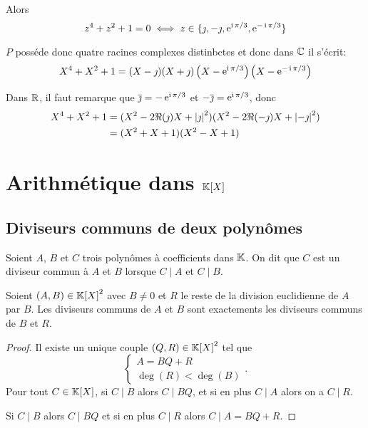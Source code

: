 Alors
\begin{equation}
  z^4+z^2+1 = 0 \iff z \in \{\jmath, -\jmath, \operatorname{e}^{\operatorname{i}\pi/3}, \operatorname{e}^{-\operatorname{i}\pi/3}\}
\end{equation}

\(P\) posséde donc quatre racines complexes distinbctes et donc dans \(\mathbb{C}\) il 
s'écrit:
\begin{equation}
  X^4+X^2+1 = 
  (X-\jmath)(X+\jmath)\left(X-\operatorname{e}^{\operatorname{i}\pi/3}\right)\left(X-\operatorname{e}^{-\operatorname{i}\pi/3}\right)
\end{equation}

Dans \(\mathbb{R}\), il faut remarque que \(\overline{\jmath} = -\operatorname{e}^{\operatorname{i}\pi/3}\) et 
\(-\overline{\jmath} = \operatorname{e}^{\operatorname{i}\pi/3}\), donc
\begin{align}
  X^4+X^2+1 &= 
  (X^2-2\Re(\jmath)X+\left\lvert\jmath\right\rvert^2)(X^2-2\Re(-\jmath)X+\left\lvert-\jmath\right\rvert^2)\\
  & = (X^2+X+1)(X^2-X+1)
\end{align}

\section{Arithmétique dans \(\mathbb{K}[X]\)}

\subsection{Diviseurs communs de deux polynômes}

\begin{defdef}
  Soient \(A\), \(B\) et \(C\) trois polynômes à coefficients dans \(\mathbb{K}\). On 
  dit que \(C\) est un diviseur commun à \(A\) et \(B\) lorsque \(C\mid{}A\) et 
  \(C\mid{}B\).
\end{defdef}

\begin{prop}
  Soient \((A, B) \in {\mathbb{K}[X]}^2\) avec \(B \neq 0\) et \(R\) le reste de la division 
  euclidienne de \(A\) par \(B\). Les diviseurs communs de \(A\) et \(B\) sont 
  exactements les diviseurs communs de \(B\) et \(R\).
\end{prop}
\begin{proof}
  Il existe un unique couple \((Q, R) \in {\mathbb{K}[X]}^2\) tel que \begin{equation}
    \begin{cases} A = BQ+R \\ \deg(R) < \deg(B) \end{cases}.
  \end{equation}
  Pour tout \(C \in \mathbb{K}[X]\), si  \(C\mid{}B\) alors \(C\mid{}BQ\), et si en plus 
  \(C\mid{}A\) alors on a \(C\mid{}R\).

  Si \(C\mid{}B\) alors \(C\mid{}BQ\) et si en plus \(C\mid{}R\) alors 
  \(C\mid{}A = BQ+R\).
\end{proof}

